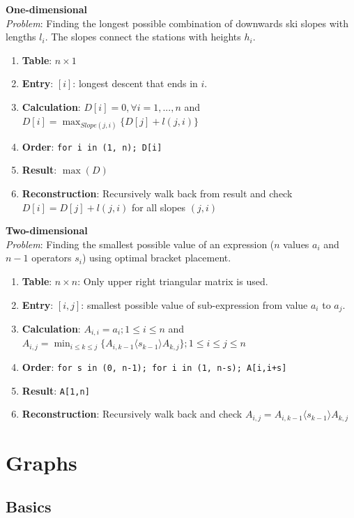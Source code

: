 \documentclass[10pt,landscape,a4paper, table]{extarticle}
\begin{document}
\begin{multicols*}{3}
\textbf{One-dimensional}\\
\textit{Problem}: Finding the longest possible combination of downwards ski slopes with lengths $l_i$. The slopes connect the stations with heights $h_i$.  
\begin{enumerate}
    \item \textbf{Table}: $n\times 1$ 
    \item \textbf{Entry}: $[i]$: longest descent that ends in $i$.
    \item \textbf{Calculation}: $D[i] = 0, \forall i = 1, ... ,n$ and $\displaystyle D[i] = \max_{Slope(j,i)}\{D[j] + l(j,i)\}$
    \item \textbf{Order}: \texttt{for i in (1, n); D[i]}
    \item \textbf{Result}: $\max(D)$
    \item \textbf{Reconstruction}: Recursively walk back from result and check $\displaystyle D[i] = D[j] + l(j,i)$ for all slopes $(j,i)$
\end{enumerate}

\textbf{Two-dimensional}\\
\textit{Problem}: Finding the smallest possible value of an expression ($n$ values $a_i$ and $n-1$ operators $s_i$) using optimal bracket placement. 
\begin{enumerate}
    \item \textbf{Table}: $n\times n$: Only upper right triangular matrix is used. 
    \item \textbf{Entry}: $[i,j]$: smallest possible value of sub-expression from value $a_i$ to $a_j$.
    \item \textbf{Calculation}: $A_{i,i} = a_i; 1\leq i \leq n$ and $\displaystyle A_{i,j} = \min_{i\leq k \leq j}\{A_{i,k-1}\langle s_{k-1}\rangle A_{k,j}\}; 1\leq i\leq j\leq n$
    \item \textbf{Order}: \texttt{for s in (0, n-1); for i in (1, n-s); A[i,i+s]}
    \item \textbf{Result}: \texttt{A[1,n]}
    \item \textbf{Reconstruction}: Recursively walk back and check $\displaystyle A_{i,j} = A_{i,k-1}\langle s_{k-1}\rangle A_{k,j}$
\end{enumerate}

\section{Graphs}

\subsection{Basics}


\end{multicols*}
\end{document}
